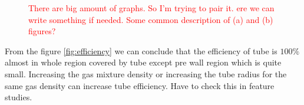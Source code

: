 \documentclass[]{article}
\begin{document}
	\begin{figure}[h!]
		\centering
		\qquad
		\caption{ \textcolor{red}{ There are big amount of graphs. So I'm trying to pair it. ere we can write something if needed. Some common description of (a) and (b) figures?} }
	\end{figure}
	
	From the figure \ref{fig:efficiency} we can conclude that the efficiency of tube is $100\%$ almost in whole region covered by tube except pre wall region which is quite small. Increasing the gas mixture density or increasing the tube radius for the same gas density can increase tube efficiency. Have to check this in feature studies.
	
	
	
	
	 
\end{document}
